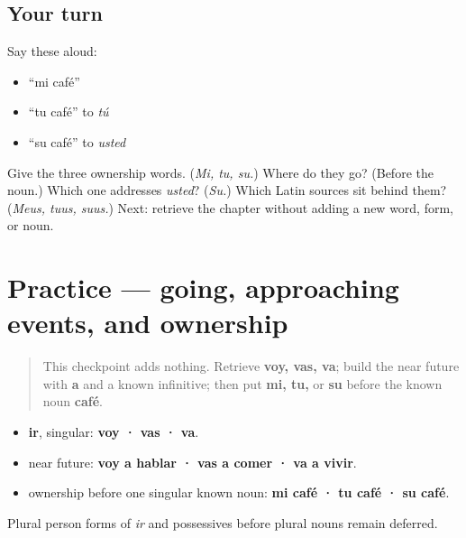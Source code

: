 \subsection*{Your turn}
Say these aloud:

\begin{itemize}
\raggedright
  \item “mi café”
  \item “tu café” to \emph{tú}
  \item “su café” to \emph{usted}
\end{itemize}

\begin{tcolorbox}[breakable,colback=teal!4,colframe=teal!35!black,title={Before you move on}]
Give the three ownership words. (\emph{Mi, tu, su.}) Where do they go? (Before the noun.) Which one addresses \emph{usted}? (\emph{Su.}) Which Latin sources sit behind them? (\emph{Meus, tuus, suus.}) Next: retrieve the chapter without adding a new word, form, or noun.
\end{tcolorbox}
\section[Practice]{Practice — going, approaching events, and ownership}

\label{lesson:ES-C10-practice}



\begin{quote}
This checkpoint adds nothing. Retrieve \textbf{voy, vas, va}; build the near future with \textbf{a} and a known infinitive; then put \textbf{mi, tu,} or \textbf{su} before the known noun \textbf{café}.
\end{quote}

\begin{grammarlens}[title={Grammar Lens: the complete small chapter frame}]
\begin{itemize}
\raggedright
  \item \textbf{ir}, singular: \textbf{voy · vas · va}.
  \item near future: \textbf{voy a hablar · vas a comer · va a vivir}.
  \item ownership before one singular known noun: \textbf{mi café · tu café · su café}.
\end{itemize}

Plural person forms of \emph{ir} and possessives before plural nouns remain deferred.
\end{grammarlens}

